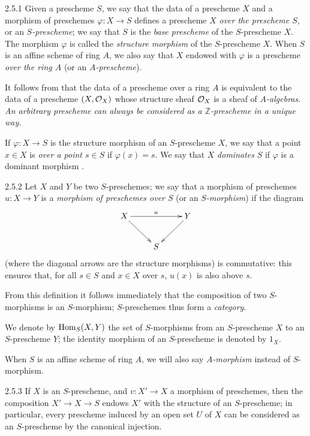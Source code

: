 
\begin{envr}[Definition]{2.5.1}
\label{defn-1.2.5.1}
Given a prescheme $S$, we say that the data of a
prescheme $X$ and a morphism of preschemes $\varphi\colon X\to S$ defines a
prescheme $X$ \emph{over the prescheme $S$}, or an \emph{$S$-prescheme}; we say
that $S$ is the \emph{base prescheme} of the $S$-prescheme $X$. The morphism
$\varphi$ is called the \emph{structure morphism} of the $S$-prescheme $X$.
When $S$ is an affine scheme of ring $A$, we also say that $X$ endowed with
$\varphi$ is a prescheme \emph{over the ring $A$} (or an \emph{$A$-prescheme}).
\end{envr}

It follows from  that the data of a prescheme over a ring $A$ is
equivalent to the data of a prescheme $(X,\mathcal{O}_X)$ whose structure sheaf $\mathcal{O}_X$ is
a sheaf of \emph{$A$-algebras}. \emph{An arbitrary prescheme can always be
considered as a $\mathbb{Z}$-prescheme in a unique way.}

If $\varphi\colon X\to S$ is the structure morphism of an $S$-prescheme $X$, we
say that a point $x\in X$ is \emph{over a point $s\in S$} if $\varphi(x)=s$.  We
say that $X$ \emph{dominates} $S$ if $\varphi$ is a dominant morphism .

\begin{env}{2.5.2}
\label{env-1.2.5.2}
Let $X$ and $Y$ be two $S$-preschemes; we say that a morphism
of preschemes $u\colon X\to Y$ is a \emph{morphism of preschemes over $S$} (or
an \emph{$S$-morphism}) if the diagram
\[
  \xymatrix{
    X \ar[rr]^u \ar[dr] & & Y\ar[dl]\\
    & S &
  }
\]
(where the diagonal arrows are the structure morphisms) is
commutative: this ensures that, for all $s\in S$ and $x\in X$ over $s$, $u(x)$
is also above $s$.
\end{env}

From this definition it follows immediately that the composition of two
$S$-morphisms is an $S$-morphism; $S$-preschemes thus form a \emph{category}.

We denote by $\operatorname{Hom}_S(X,Y)$ the set of $S$-morphisms from an $S$-prescheme $X$ to
an $S$-prescheme $Y$; the identity morphism of an $S$-prescheme is denoted by
$1_X$.

When $S$ is an affine scheme of ring $A$, we will also say \emph{$A$-morphism}
instead of $S$-morphism.

\begin{env}{2.5.3}
\label{env-1.2.5.3}
If $X$ is an $S$-prescheme, and $v\colon X'\to X$ a morphism of preschemes,
then the composition $X'\to X\to S$ endows $X'$ with the structure of an $S$-prescheme;
in particular, every prescheme induced by an open set $U$ of $X$ can be considered as an
$S$-prescheme by the canonical injection.
\end{env}

